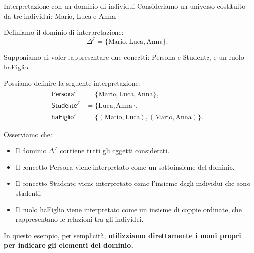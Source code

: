 \begin{example}{Interpretazione con un dominio di individui}
    Consideriamo un universo costituito da tre individui:
    Mario, Luca e Anna.

    Definiamo il dominio di interpretazione:
    \[
        \Delta^{\mathcal I}
        = \{\text{Mario},\text{Luca},\text{Anna}\}.
    \]

    Supponiamo di voler rappresentare due concetti:
    \textsf{Persona} e \textsf{Studente}, e un ruolo
    \textsf{haFiglio}.

    Possiamo definire la seguente interpretazione:
    \[
    \begin{aligned}
        \mathsf{Persona}^{\mathcal I}
        &= \{\text{Mario},\text{Luca},\text{Anna}\},\\
        \mathsf{Studente}^{\mathcal I}
        &= \{\text{Luca},\text{Anna}\},\\
        \mathsf{haFiglio}^{\mathcal I}
        &= \{(\text{Mario},\text{Luca}),
             (\text{Mario},\text{Anna})\}.
    \end{aligned}
    \]

    Osserviamo che:
    \begin{itemize}
        \item Il dominio $\Delta^{\mathcal I}$ contiene
        tutti gli oggetti considerati.

        \item Il concetto \textsf{Persona} viene
        interpretato come un sottoinsieme del dominio.

        \item Il concetto \textsf{Studente} viene
        interpretato come l'insieme degli individui
        che sono studenti.

        \item Il ruolo \textsf{haFiglio} viene
        interpretato come un insieme di coppie
        ordinate, che rappresentano le relazioni
        tra gli individui.
    \end{itemize}

    In questo esempio, per semplicità, \textbf{utilizziamo
    direttamente i nomi propri per indicare
    gli elementi del dominio.}
\end{example}

